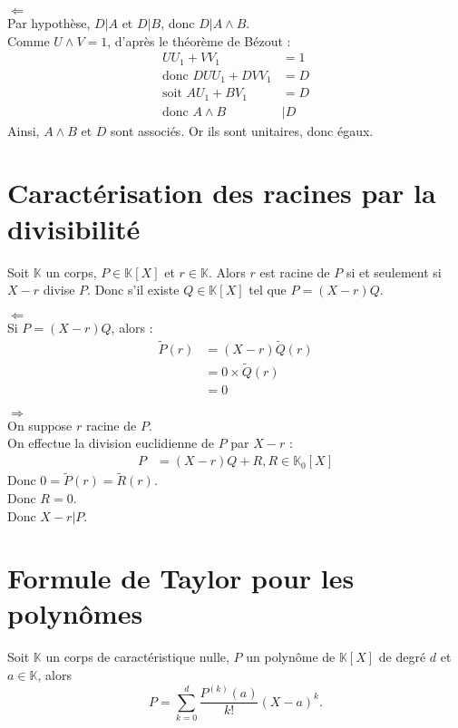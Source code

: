 \documentclass[../main.tex]{subfiles}
\begin{document}
\begin{itemize}
    $\boxed{\Leftarrow}$ \\
    Par hypothèse, $D | A$ et $D | B$, donc $D | A \wedge B$. \\
    Comme $U \wedge V = 1$, d'après le théorème de Bézout : 
    \begin{align*}
        UU_1 + VV_1 &= 1 \\
        \text{donc } DUU_1 + DVV_1 &= D \\
        \text{soit } AU_1 + BV_1 &= D \\
        \text{donc } A \wedge B &| D
    \end{align*}
    Ainsi, $A \wedge B$ et $D$ sont associés. Or ils sont unitaires, donc égaux. 
\end{itemize}

\section{Caractérisation des racines par la divisibilité}
\begin{tcolorbox}[title=Théorème 16.53, title filled=false, colframe=orange, colback=orange!10!white]
    Soit $\mathbb{K}$ un corps, $P \in \mathbb{K}[X]$ et $r \in \mathbb{K}$. Alors $r$ est racine de $P$ si et seulement si $X - r$ divise $P$. Donc s'il existe $Q \in \mathbb{K}[X]$ tel que $P = (X - r)Q$.
\end{tcolorbox}

$\boxed{\Leftarrow}$ \\
Si $P = (X - r)Q$, alors : 
\begin{align*}
    \tilde{P}(r) &= (X - r)\tilde{Q}(r)  \\
    &= 0 \times \tilde Q (r) \\
    &= 0
\end{align*}

$\boxed{\Rightarrow}$ \\
On suppose $r$ racine de $P$. \\
On effectue la division euclidienne de $P$ par $X - r$ :
\begin{align*}
    P &= (X - r)Q + R, R \in \mathbb{K}_0[X]
\end{align*}
Donc $0 = \tilde P(r) = \tilde R(r)$. \\
Donc $R = 0$. \\
Donc $X - r | P$.

\section{Formule de Taylor pour les polynômes}
\begin{tcolorbox}[title=Théorème 16.56, title filled=false, colframe=orange, colback=orange!10!white]
    Soit $\mathbb{K}$ un corps de caractéristique nulle, $P$ un polynôme de $\mathbb{K}[X]$ de degré $d$ et $a \in \mathbb{K}$, alors
    $$ P = \sum_{k=0}^{d} \frac{P^{(k)}(a)}{k!} (X - a)^k. $$
\end{tcolorbox}
\end{document}
